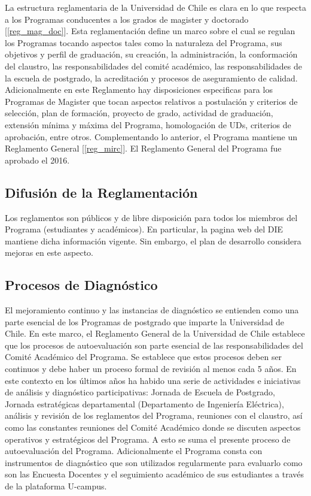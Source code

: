 La estructura reglamentaria de la Universidad de Chile es clara en lo que respecta a los Programas
conducentes a los grados de magister y doctorado [\ref{reg_mag_doc}]. Esta reglamentación define un marco
sobre el cual se regulan los Programas tocando aspectos tales como la naturaleza del Programa,
sus objetivos y perfil de graduación, su creación, la administración, la conformación del claustro,
las responsabilidades del comité académico, las responsabilidades de la escuela de postgrado, la
acreditación y procesos de aseguramiento de calidad. Adicionalmente en este Reglamento hay
disposiciones especificas para los Programas de Magister que tocan aspectos relativos a postulación
y criterios de selección, plan de formación, proyecto de grado, actividad de graduación, extensión
mínima y máxima del Programa, homologación de UDs, criterios de aprobación, entre otros.
Complementando lo anterior, el Programa mantiene un Reglamento General [\ref{reg_mirc}]. El Reglamento General del
Programa fue aprobado el 2016.


\subsection{Difusión de la Reglamentación}

Los reglamentos son públicos y de libre disposición para todos los miembros del Programa
(estudiantes y académicos). En particular, la pagina web del DIE mantiene dicha información
vigente. Sin embargo, el plan de desarrollo considera mejoras en este aspecto.

\subsection{Procesos de Diagnóstico}

El mejoramiento continuo y las instancias de diagnóstico se entienden como una parte esencial de
los Programas de postgrado que imparte la Universidad de Chile. En este marco, el Reglamento
General de la Universidad de Chile establece que los procesos de autoevaluación son parte esencial
de las responsabilidades del Comité Académico del Programa. Se establece que estos procesos
deben ser continuos y debe haber un proceso formal de revisión al menos cada 5 años. En
este contexto en los últimos años ha habido una serie de actividades e iniciativas de análisis y
diagnóstico participativas: Jornada de Escuela de Postgrado, Jornada estratégicas departamental
(Departamento de Ingeniería Eléctrica), análisis y revisión de los reglamentos del Programa,
reuniones con el claustro, así como las constantes reuniones del Comité Académico donde se
discuten aspectos operativos y estratégicos del Programa. A esto se suma el presente proceso de
autoevaluación del Programa. Adicionalmente el Programa consta con instrumentos de diagnóstico
que son utilizados regularmente para evaluarlo como son las Encuesta Docentes y el seguimiento
académico de sus estudiantes a través de la plataforma U-campus.

